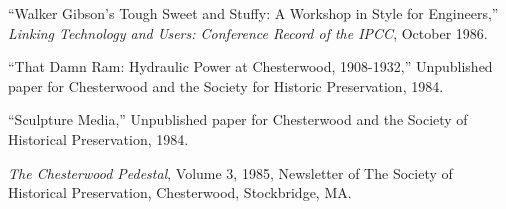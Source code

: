 \begin{resume}
``Walker Gibson's Tough Sweet and Stuffy: A Workshop in Style for 
Engineers,'' {\it Linking Technology and Users: Conference Record of 
the IPCC}, October 1986. 
 
``That Damn Ram: Hydraulic Power at Chesterwood, 1908-1932,'' 
Unpublished paper for Chesterwood and the Society for Historic 
Preservation, 1984. 
 
``Sculpture Media,'' Unpublished paper for Chesterwood and the 
Society of Historical Preservation, 1984. 
 
{\it The Chesterwood Pedestal}, Volume 3, 1985, Newsletter of The 
Society of Historical Preservation, Chesterwood, Stockbridge, MA. 
 
\end{resume}































